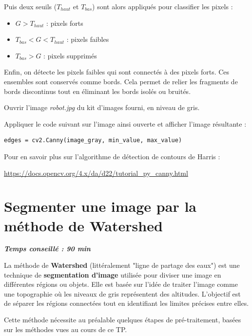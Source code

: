 \documentclass[a4paper,11pt,titlepage]{article} %
\begin{document}
Puis deux seuils ($T_{haut}$ et $T_{bas}$) sont alors appliqués pour classifier les pixels :

\begin{itemize}
	\item $G > T_{haut}$ : pixels forts
	\item $T_{bas} < G < T_{haut}$ : pixels faibles
	\item $T_{bas} > G$ : pixels supprimés
\end{itemize}

Enfin, on détecte les pixels faibles qui sont connectés à des pixels forts. Ces ensembles sont conservés comme bords. Cela permet de relier les fragments de bords discontinus tout en éliminant les bords isolés ou bruités.

\medskip

\Manip Ouvrir l'image \textsl{robot.jpg} du kit d'images fourni, en niveau de gris. 

\Manip Appliquer le code suivant sur l'image ainsi ouverte et afficher l'image résultante :

\begin{lstlisting}
edges = cv2.Canny(image_gray, min_value, max_value)
\end{lstlisting}

\medskip

Pour en savoir plus sur l'algorithme de détection de contours de Harris : 

\href{https://docs.opencv.org/4.x/da/d22/tutorial_py_canny.html}{https://docs.opencv.org/4.x/da/d22/tutorial\_py\_canny.html} 


\newpage
\section{Segmenter une image par la méthode de Watershed}

\begin{center} \textbf{\textit{Temps conseillé : 90 min}} \end{center}

La méthode de \textbf{Watershed} (littéralement "ligne de partage des eaux") est une technique de \textbf{segmentation d'image} utilisée pour diviser une image en différentes régions ou objets. Elle est basée sur l'idée de traiter l'image comme une topographie où les niveaux de gris représentent des altitudes. L'objectif est de séparer les régions connectées tout en identifiant les limites précises entre elles.

Cette méthode nécessite au préalable quelques étapes de pré-traitement, basées sur les méthodes vues au cours de ce TP. 
\end{document}
